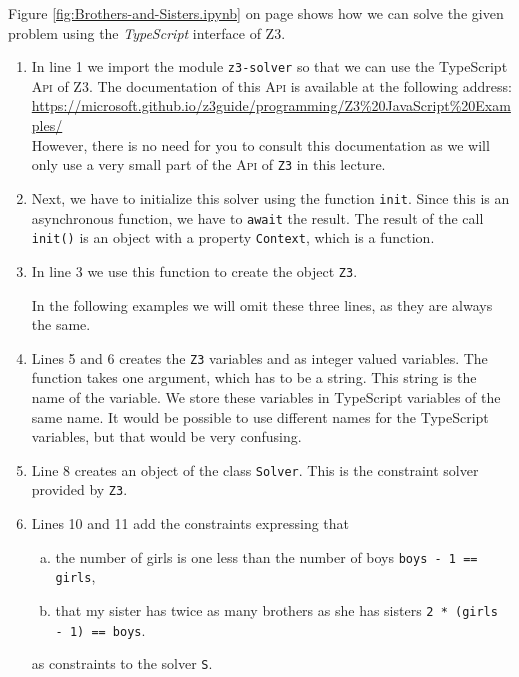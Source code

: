 \noindent
Figure \ref{fig:Brothers-and-Sisters.ipynb} on page \pageref{fig:Brothers-and-Sisters.ipynb} shows how we can
solve the given problem using the \textsl{TypeScript}
interface of Z3.
\begin{enumerate}
\item In line 1 we import the module \texttt{z3-solver} so that we can use the TypeScript \textsc{Api} of Z3.
      The documentation of this \textsc{Api} is available at the following address:
      \\[0.2cm]
      \hspace*{1.0cm}
      \url{https://microsoft.github.io/z3guide/programming/Z3%20JavaScript%20Examples/}
      \\[0.2cm]
      However, there is no need for you to consult this documentation as we will only use a very small part of
      the \textsc{Api} of \texttt{Z3} in this lecture.
\item Next, we have to initialize this solver using the function \texttt{init}.
      Since this is an asynchronous function, we have to \texttt{await} the result. The result of the call
      \texttt{init()} is an object with a property \texttt{Context}, which is a function.
\item In line 3 we use this function to create the object \texttt{Z3}.
      
      In the following examples we will omit these three lines, as they are always the same.
\item Lines 5 and 6 creates the \texttt{Z3} variables  and  as integer valued variables.
      The function  takes one argument, which has to be a string.  This string is the name of the
      variable.  We store these variables in TypeScript variables of the same name.  It would be possible to use
      different names for the TypeScript variables, but that would be very confusing.
\item Line 8 creates an object of the class \texttt{Solver}.  This is the constraint solver provided by
      \texttt{Z3}.
      \item Lines 10 and 11 add the constraints expressing that
      \begin{enumerate}[(a)]
      \item the number of girls is one less than the number of boys \texttt{boys - 1 == girls},
      \item that my sister has twice as many brothers as she has sisters \texttt{2 * (girls - 1) == boys}.
      \end{enumerate}
      as constraints to the solver \texttt{S}.


\end{enumerate}
